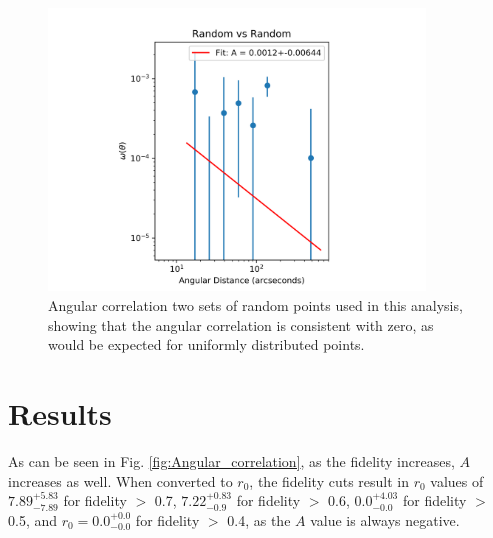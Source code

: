 \begin{figure}[tbp]
\centering \includegraphics[width=100mm]{clustering/Log_Random_vs_Random_15000NoParenFlip_bin10.png}
\caption{Angular correlation two sets of random points used in this analysis, showing that the angular correlation is consistent with zero, as would be expected for uniformly distributed points.}
\label{fig:random_points}
\end{figure}

\section{Results}

As can be seen in Fig. \ref{fig:Angular_correlation}, as the fidelity increases, $A$ increases as well.  When converted to $r_0$, the fidelity cuts result in $r_0$ values of $7.89_{-7.89}^{+5.83}$ for fidelity $>$ 0.7, $7.22_{-0.9}^{+0.83}$ for fidelity $>$ 0.6, $0.0_{-0.0}^{+4.03}$ for fidelity $>$ 0.5, and $r_0 = 0.0_{-0.0}^{+0.0}$ for fidelity $>$ 0.4, as the $A$ value is always negative. 

